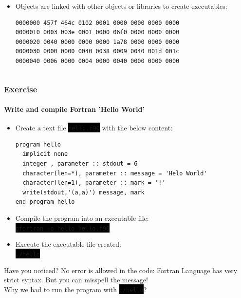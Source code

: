 \documentclass[unknownkeysallowed, 10pt, a4 paper, handout]{beamer}
\newcommand{\code}[1]{\colorbox{black}{\color{green}\texttt{#1}}}
\begin{document}
\begin{frame}[label=Fortran, fragile=singleslide]
\begin{columns}[T]
\begin{column}{.76\textwidth}
\begin{itemize}
{            create binary object files:} \\
          \footnotesize{
          \code{gfortran -o myprog myprog.f90}
          }
        \item \normalsize{Objects are linked with other objects or
           libraries to create executables:} \\
          \footnotesize{
            \begin{verbatim}
0000000 457f 464c 0102 0001 0000 0000 0000 0000
0000010 0003 003e 0001 0000 06f0 0000 0000 0000
0000020 0040 0000 0000 0000 1a78 0000 0000 0000
0000030 0000 0000 0040 0038 0009 0040 001d 001c
0000040 0006 0000 0004 0000 0040 0000 0000 0000
            \end{verbatim}
          }
      \end{itemize}
    \end{column}
  \end{columns}
\end{frame}


\begin{frame}[label=exercise1, fragile=singleslide]
  \frametitle{Exercise}
  \framesubtitle{Write and compile Fortran 'Hello World'}
  \begin{itemize}
    \item Create a text file \code{hello.f90} with the below content:
      \footnotesize{
      \begin{verbatim}
program hello
  implicit none
  integer , parameter :: stdout = 6
  character(len=*), parameter :: message = 'Helo World'
  character(len=1), parameter :: mark = '!'
  write(stdout,'(a,a)') message, mark
end program hello
      \end{verbatim}
      }
    \item Compile the program into an executable file: \\
      \code{gfortran -o hello hello.f90}
    \item Execute the executable file created: \\
      \code{./hello}
  \end{itemize}
    \begin{alertblock}{Have you noticed?}
      No error is allowed in the code: Fortran Language has very
        strict syntax. But you can misspell the message! \\
      Why we had to run the program with \code{./hello}?
    \end{alertblock}
\end{frame}
\end{document}
